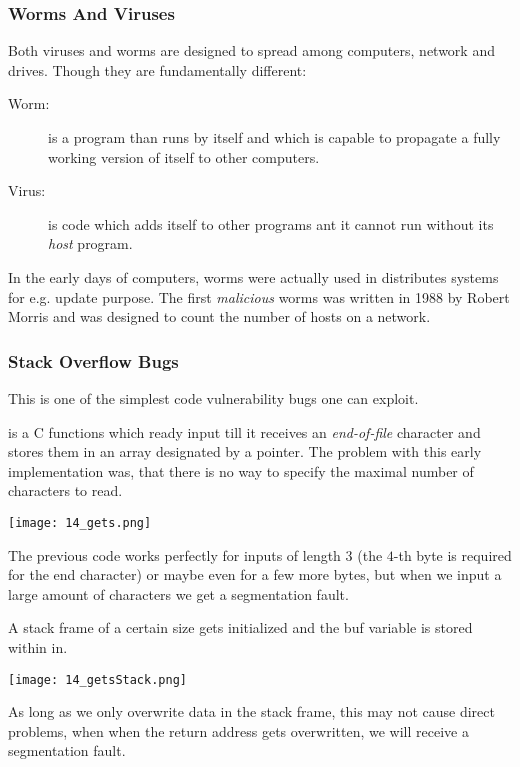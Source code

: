 

\subsubsection{Worms And Viruses}
Both viruses and worms are designed to spread among computers, network and drives. Though they are fundamentally different:

\begin{description}
    \item[Worm:] is a program than runs by itself and which is capable to propagate a fully working version of itself to other computers.
    \item[Virus:] is code which adds itself to other programs ant it cannot run without its \textit{host} program.
\end{description}

In the early days of computers, worms were actually used in distributes systems for e.g. update purpose. The first \textit{malicious} worms was written in 1988 by Robert Morris and was designed to count the number of hosts on a network. 

\subsubsection{Stack Overflow Bugs}
This is one of the simplest code vulnerability bugs one can exploit.

 is a C functions which ready input till it receives an \textit{end-of-file} character and stores them in an array designated by a pointer. The problem with this early implementation was, that there is no way to specify the maximal number of characters to read.

\texttt{[image: 14\_gets.png]}

The previous code works perfectly for inputs of length $3$ (the $4$-th byte is required for the end character) or maybe even for a few more bytes, but when we input a large amount of characters we get a segmentation fault. 

A stack frame of a certain size gets initialized and the buf variable is stored within in.

\texttt{[image: 14\_getsStack.png]}

As long as we only overwrite data in the stack frame, this may not cause direct problems, when when the return address gets overwritten, we will receive a segmentation fault.

